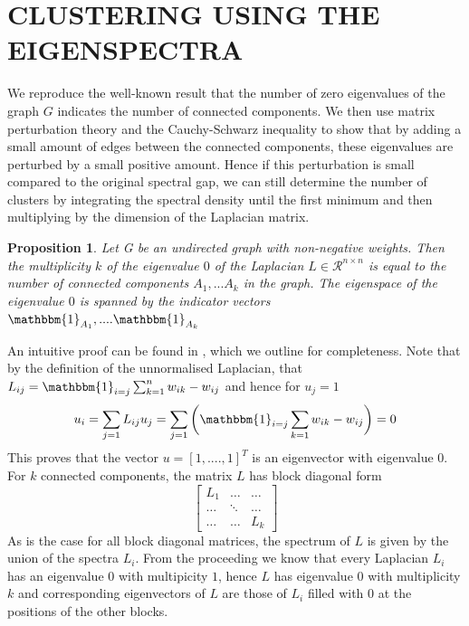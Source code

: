 \documentclass{article}
\newtheorem{proposition}{Proposition}
\begin{document}
\section{CLUSTERING USING THE EIGENSPECTRA}
We reproduce the well-known result that the number of zero eigenvalues of the graph $G$ indicates the number of connected components. We then use matrix perturbation theory and the Cauchy-Schwarz inequality to show that by adding a small amount of edges between the connected components, these eigenvalues are perturbed by a small positive amount. Hence if this perturbation is small compared to the original spectral gap, we can still determine the number of clusters by integrating the spectral density until the first minimum and then multiplying by the dimension of the Laplacian matrix.
\begin{proposition}
	\label{numberof0eigenvalues}
	Let G be an undirected graph with non-negative weights. Then the multiplicity $k$ of the eigenvalue $0$ of the Laplacian $L\in \mathcal{R}^{n\times n}$ is equal to the number of connected components $A_{1},...A_{k}$ in the graph. The eigenspace of the eigenvalue $0$ is spanned by the indicator vectors $\mathbbm{1}_{A_{1}},....\mathbbm{1}_{A_{k}}$
	\end{proposition} 
An intuitive proof can be found in \citep{von2007tutorial}, which we outline for completeness. Note that by the definition of the unnormalised Laplacian, that $L_{ij} = \mathbbm{1}_{i=j}\sum_{k=1}^{n}w_{ik}-w_{ij}$ and hence for $u_{j} = 1$
\begin{equation}
u_{i} = \sum_{j=1}L_{ij}u_{j} = \sum_{j=1}\bigg(\mathbbm{1}_{i=j}\sum_{k=1}w_{ik} - w_{ij}\bigg) = 0 
\end{equation}
This proves that the vector $u = [1,....,1]^T$ is an eigenvector with eigenvalue $0$. For $k$ connected components, the matrix $L$ has block diagonal form
\[
\begin{bmatrix}
	L_{1} & \dots  & \dots \\
	\dots & \ddots & \dots  \\
	\dots & \dots & L_{k}
\end{bmatrix}
\]
As is the case for all block diagonal matrices, the spectrum of $L$ is given by the union of the spectra $L_{i}$. From the proceeding we know that every Laplacian $L_{i}$ has an eigenvalue $0$ with multipicity $1$, hence $L$ has eigenvalue $0$ with multiplicity $k$ and corresponding eigenvectors of $L$ are those of $L_{i}$ filled with $0$ at the positions of the other blocks. 
\end{document}
